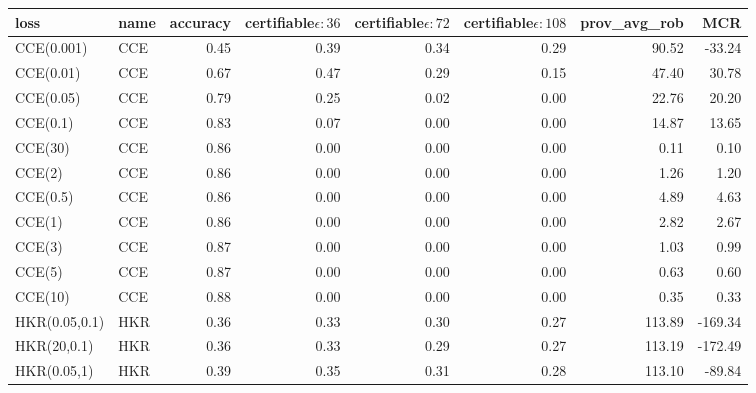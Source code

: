 \begin{tabular}{llrrrrrr}
\hline
          loss &  name &  accuracy &  certifiable\newline $\epsilon:36$ & certifiable\newline $\epsilon:72$ &  certifiable\newline $\epsilon:108$ &  prov\_avg\_rob &  MCR \\
\hline
    CCE(0.001) &   CCE &      0.45 &         0.39 &         0.34 &          0.29 &         90.52 &         -33.24 \\
     CCE(0.01) &   CCE &      0.67 &         0.47 &         0.29 &          0.15 &         47.40 &          30.78 \\
     CCE(0.05) &   CCE &      0.79 &         0.25 &         0.02 &          0.00 &         22.76 &          20.20 \\
      CCE(0.1) &   CCE &      0.83 &         0.07 &         0.00 &          0.00 &         14.87 &          13.65 \\
       CCE(30) &   CCE &      0.86 &         0.00 &         0.00 &          0.00 &          0.11 &           0.10 \\
        CCE(2) &   CCE &      0.86 &         0.00 &         0.00 &          0.00 &          1.26 &           1.20 \\
      CCE(0.5) &   CCE &      0.86 &         0.00 &         0.00 &          0.00 &          4.89 &           4.63 \\
        CCE(1) &   CCE &      0.86 &         0.00 &         0.00 &          0.00 &          2.82 &           2.67 \\
        CCE(3) &   CCE &      0.87 &         0.00 &         0.00 &          0.00 &          1.03 &           0.99 \\
        CCE(5) &   CCE &      0.87 &         0.00 &         0.00 &          0.00 &          0.63 &           0.60 \\
       CCE(10) &   CCE &      0.88 &         0.00 &         0.00 &          0.00 &          0.35 &           0.33 \\
 HKR(0.05,0.1) &   HKR &      0.36 &         0.33 &         0.30 &          0.27 &        113.89 &        -169.34 \\
   HKR(20,0.1) &   HKR &      0.36 &         0.33 &         0.29 &          0.27 &        113.19 &        -172.49 \\
   HKR(0.05,1) &   HKR &      0.39 &         0.35 &         0.31 &          0.28 &        113.10 &         -89.84 \\

\end{tabular}
